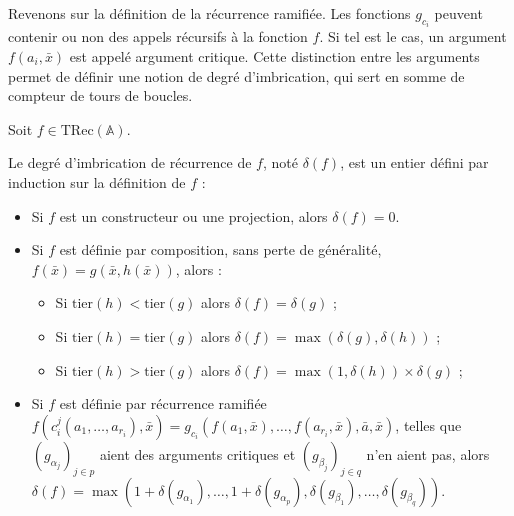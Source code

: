 \documentclass{report}
\newcommand{\TRec}[1]{\text{TRec}\left(\mathbb{#1}\right)}
\begin{document}
			Revenons sur la définition de la récurrence ramifiée. Les fonctions $g_{c_i}$ peuvent contenir ou non des appels récursifs à la fonction $f$. Si tel est le cas, un argument $f\left( a_i, \bar{x} \right)$ est appelé argument critique. Cette distinction entre les arguments permet de définir une notion de degré d'imbrication, qui sert en somme de compteur de tours de boucles. 
			
			
			\begin{definition}
				\label{def:degre_recurrence}
				
				Soit $f \in \TRec{A}$. 
				
				
				Le degré d'imbrication de récurrence de $f$, noté $\delta(f)$, est un entier défini par induction sur la définition de $f$ :
				
				\begin{itemize}[itemsep=-1mm]
					\item 	Si $f$ est un constructeur ou une projection, alors $\delta(f) = 0$.
					\item 	Si $f$ est définie par composition, sans perte de généralité, $f(\bar{x}) = g\left( \bar{x}, h\left( \bar{x}\right)\right)$, alors :
					
							\begin{itemize}[itemsep=-1mm]
								\item 	Si $\text{tier}(h) < \text{tier}(g)$ alors $\delta(f) = \delta(g)$ ;
								\item 	Si $\text{tier}(h) = \text{tier}(g)$ alors $\delta(f) = \max\left(\delta(g), \delta(h)\right)$ ;
								\item 	Si $\text{tier}(h) > \text{tier}(g)$ alors $\delta(f) = \max\left(1, \delta(h)\right) \times \delta(g)$ ;
							\end{itemize}
							
					\item 	Si $f$ est définie par récurrence ramifiée $f(c_i^j(a_1, \dots, a_{r_i}), \bar{x}) = g_{c_i}\left( f(a_1, \bar{x}), \dots, f(a_{r_i}, \bar{x}), \bar{a}, \bar{x} \right)$, telles que $\left( g_{\alpha_j}\right)_{j\in p}$ aient des arguments critiques et $\left( g_{\beta_j}\right)_{j\in q}$ n'en aient pas, alors $\delta(f) = \max\left( 1 + \delta\left( g_{\alpha_1} \right), \dots,  1 + \delta\left( g_{\alpha_p} \right), \delta\left( g_{\beta_1} \right), \dots,  \delta\left( g_{\beta_q} \right)\right)$. 
				\end{itemize}
			\end{definition}
			
\end{document}
